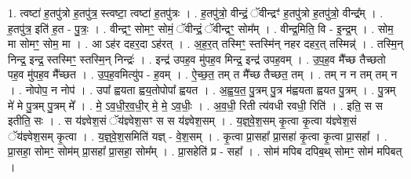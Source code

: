 \documentclass[17pt]{extarticle}
\begin{document}
1. त्वष्टा॑ ह॒तपु॑त्रो ह॒तपु॑त्र॒ स्त्वष्टा॒ त्वष्टा॑ ह॒तपु॑त्रः । . ह॒तपु॑त्रो॒ वीन्द्रं॒ ॅवीन्द्रꣳ॑ ह॒तपु॑त्रो ह॒तपु॑त्रो॒ वीन्द्र᳚म् । . ह॒तपु॑त्र॒ इति॑ ह॒त - पु॒त्रः॒ । . वीन्द्रꣳ॒॒ सोमꣳ॒॒ सोमं॒ ॅवीन्द्रं॒ ॅवीन्द्रꣳ॒॒ सोम᳚म् । . वीन्द्र॒मिति॒ वि - इ॒न्द्र॒म् । . सोम॒ मा सोमꣳ॒॒ सोम॒ मा । . आ ऽह॑र दहर॒दा ऽह॑रत् । . अ॒ह॒र॒त् तस्मिꣳ॒॒ स्तस्मि॑न् नहर दहर॒त् तस्मिन्न्॑ । . तस्मि॒न् निन्द्र॒ इन्द्र॒ स्तस्मिꣳ॒॒ स्तस्मि॒न् निन्द्रः॑ । . इन्द्र॑ उपह॒व मु॑पह॒व मिन्द्र॒ इन्द्र॑ उपह॒वम् । . उ॒प॒ह॒व मै᳚च्छ तैच्छतो पह॒व मु॑पह॒व मै᳚च्छत । . उ॒प॒ह॒वमित्यु॑प - ह॒वम् । . ऐ॒च्छ॒त॒ तम् त मै᳚च्छ तैच्छत॒ तम् । . तम् न न तम् तम् न । . नोपोप॒ न नोप॑ । . उपा᳚ ह्वयता ह्वय॒तोपोपा᳚ ह्वयत । . अ॒ह्व॒य॒त॒ पु॒त्रम् पु॒त्र म॑ह्वयता ह्वयत पु॒त्रम् । . पु॒त्रम् मे॑ मे पु॒त्रम् पु॒त्रम् मे᳚ । . मे॒ ऽव॒धी॒र॒व॒धी॒र् मे॒ मे॒ ऽव॒धीः॒ । . अ॒व॒धी॒ रिती त्य॑वधी रवधी॒ रिति॑ । . इति॒ स स इतीति॒ सः । . स य॑ज्ञ्वेश॒सं ॅय॑ज्ञ्वेश॒सꣳ स स य॑ज्ञ्वेश॒सम् । . य॒ज्ञ्॒वे॒श॒सम् कृ॒त्वा कृ॒त्वा य॑ज्ञ्वेश॒सं ॅय॑ज्ञ्वेश॒सम् कृ॒त्वा । . य॒ज्ञ्॒वे॒श॒समिति॑ यज्ञ् - वे॒श॒सम् । . कृ॒त्वा प्रा॒सहा᳚ प्रा॒सहा॑ कृ॒त्वा कृ॒त्वा प्रा॒सहा᳚ । . प्रा॒सहा॒ सोमꣳ॒॒ सोम॑म् प्रा॒सहा᳚ प्रा॒सहा॒ सोम᳚म् । . प्रा॒सहेति॑ प्र - सहा᳚ । . सोम॑ मपिब दपिब॒थ् सोमꣳ॒॒ सोम॑ मपिबत् । \newline
\end{document}
